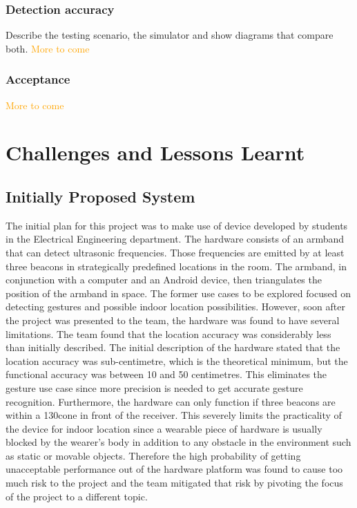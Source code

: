\documentclass[prodmode,acmtosem]{acmsmall} %
\begin{document}

\subsubsection{Detection accuracy}
Describe the testing scenario, the simulator and show diagrams that compare both.
\textcolor{orange}{More to come}

\subsubsection{Acceptance}
\textcolor{orange}{More to come}

\section{Challenges and Lessons Learnt}
\subsection{Initially Proposed System}
\label{sec:Prelim}
The initial plan for this project was to make use of device developed by students in the Electrical Engineering department. The hardware consists of an armband that can detect ultrasonic frequencies. Those frequencies are emitted by at least three beacons in strategically predefined locations in the room. The armband, in conjunction with a computer and an Android device, then triangulates the position of the armband in space.
The former use cases to be explored focused on detecting gestures and possible indoor location possibilities. However, soon after the project was presented to the team, the hardware was found to have several limitations. The team found that the location accuracy was considerably less than initially described. The initial description of the hardware stated that the location accuracy was sub-centimetre, which is the theoretical minimum, but the functional accuracy was between 10 and 50 centimetres. This eliminates the gesture use case since more precision is needed to get accurate gesture recognition.
Furthermore, the hardware can only function if three beacons are within a 130\degree cone in front of the receiver. This severely limits the practicality of the device for indoor location since a wearable piece of hardware is usually blocked by the wearer's body in addition to any obstacle in the environment such as static or movable objects.
Therefore the high probability of getting unacceptable performance out of the hardware platform was found to cause too much risk to the project and the team mitigated that risk by pivoting the focus of the project to a different topic.
\end{document}

